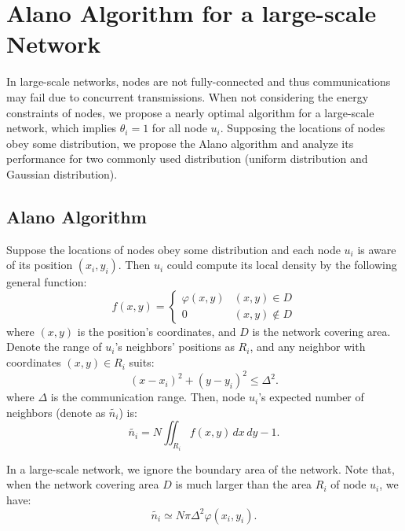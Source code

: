 \section{Alano Algorithm for a large-scale Network}
\label{PCN}


In large-scale networks, nodes are not fully-connected and thus
communications may fail due to concurrent transmissions.
When not considering the energy constraints of nodes, we propose a
nearly optimal algorithm for a large-scale network, which implies
$\theta_i = 1$ for all node $u_i$.
Supposing the locations of nodes obey some distribution, we propose the Alano
algorithm and analyze its performance for two commonly used distribution
(uniform distribution and Gaussian distribution).

\subsection{Alano Algorithm}
Suppose the locations of nodes obey some distribution and each node
$u_i$ is aware of its position $(x_i, y_i)$.
Then $u_i$ could compute its local density by the following general function: %
$$f(x,y)=
\begin{cases}
\varphi(x,y)& (x,y)\in D\\
0& (x,y)\notin D
\end{cases}$$
where $(x,y)$ is the position's coordinates,
and $D$ is the network covering area.
Denote the range of $u_i$'s neighbors' positions as $R_i$, and any
neighbor with coordinates $(x,y) \in R_i$ suits:
$$
(x-x_i)^2+(y-y_i)^2 \leq \Delta^2.
$$
where $\Delta$ is the communication range. Then, node $u_i$'s expected number of neighbors (denote as $\widetilde{n_i}$) is:
$$
\widetilde{n_i} = N\iint_{R_i} f(x,y)\,dx\,dy - 1.
$$

In a large-scale network, we ignore the boundary area of the network.
Note that, when the network covering area $D$ is much larger than the area $R_i$ of node $u_i$, we have:
\begin{equation}
\label{eqnNB}
\widetilde{n_i} \simeq N\pi \Delta^2 \varphi(x_i,y_i).
\end{equation}


